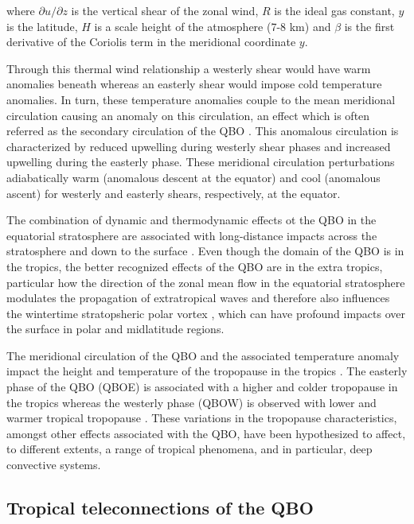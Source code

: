 \noindent where $\partial u / \partial z$ is the vertical shear of the zonal wind, $R$ is the ideal gas constant, $y$ is the latitude, $H$ is a scale height of the atmosphere (7-8 km) and $\beta$ is the first derivative of the Coriolis term in the meridional coordinate $y$. 

Through this thermal wind relationship a westerly shear would have warm anomalies beneath whereas an easterly shear would impose cold temperature anomalies. In turn, these temperature anomalies couple to the mean meridional circulation \citep{baldwin2001} causing an anomaly on this circulation, an effect which is often referred as the secondary circulation of the QBO \citep{plumb1982,li1995,ribera2004}. This anomalous circulation is characterized by reduced upwelling during westerly shear phases and increased upwelling during the easterly phase. These meridional circulation perturbations adiabatically warm (anomalous descent at the equator) and cool (anomalous ascent) for westerly and easterly shears, respectively, at the equator.

The combination of dynamic and thermodynamic effects ot the QBO in the equatorial stratosphere are associated with long-distance impacts across the stratosphere \citep{holton1980,lu2020} and down to the surface \citep{garfinkel2010,gray2018}. Even though the domain of the QBO is in the tropics, the better recognized effects of the QBO are in the extra tropics, particular how the direction of the zonal mean flow in the equatorial stratosphere modulates the propagation of extratropical waves and therefore also influences the wintertime stratopsheric polar vortex \citep{lu2020}, which can have profound impacts over the surface in polar and midlatitude regions.

The meridional circulation of the QBO and the associated temperature anomaly impact the height and temperature of the tropopause in the tropics \citep{baldwin2001,tegtmeier2020,tegtmeier2020b}. 
The easterly phase of the QBO (QBOE) is associated with a higher and colder tropopause in the tropics whereas the westerly phase (QBOW) is observed with lower and warmer tropical tropopause \citep{tegtmeier2020}. These variations in the tropopause characteristics, amongst other effects associated with the QBO, have been hypothesized to affect, to different extents, a range of tropical phenomena, and in particular, deep convective systems. %

\subsection{Tropical teleconnections of the QBO}



